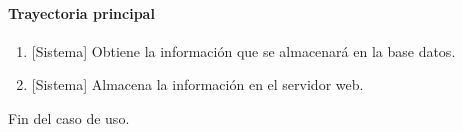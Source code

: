 \paragraph{Trayectoria principal}
	\begin{enumerate}
		\item {[Sistema]} Obtiene la información que se almacenará en la base datos.
		\item {[Sistema]} Almacena la información en el servidor web.
	\end{enumerate}
	Fin del caso de uso.


